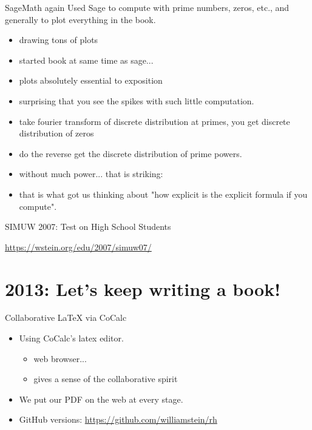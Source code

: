 \documentclass[draft]{beamer}
\begin{document}
\begin{frame}{SageMath again}
  Used Sage to compute with prime numbers, zeros, etc., and generally to plot everything in the book.
  \begin{itemize}
    \item drawing tons of plots
    \item started book at same time as sage...
    \item plots absolutely essential to exposition
    \item surprising that you see the spikes with such little computation.
    \item take fourier transform of discrete distribution at primes, you get discrete distribution of zeros
    \item do the reverse get the discrete distribution of prime powers.
    \item without much power... that is striking:
    \item that is what got us thinking about "how explicit is the explicit formula if you compute".
  \end{itemize}
\end{frame}

\begin{frame}{SIMUW 2007: Test on High School Students}

  \url{https://wstein.org/edu/2007/simuw07/}
\end{frame}


\section{2013: Let's keep writing a book!}


\begin{frame}{Collaborative LaTeX via CoCalc}
  \begin{itemize}
    \item Using CoCalc's latex editor.
          \begin{itemize}
            \item web browser...
            \item gives a sense of the collaborative spirit
          \end{itemize}
    \item We put our PDF on the web at every stage.
    \item GitHub versions: \url{https://github.com/williamstein/rh}
  \end{itemize}
\end{frame}
\end{document}
